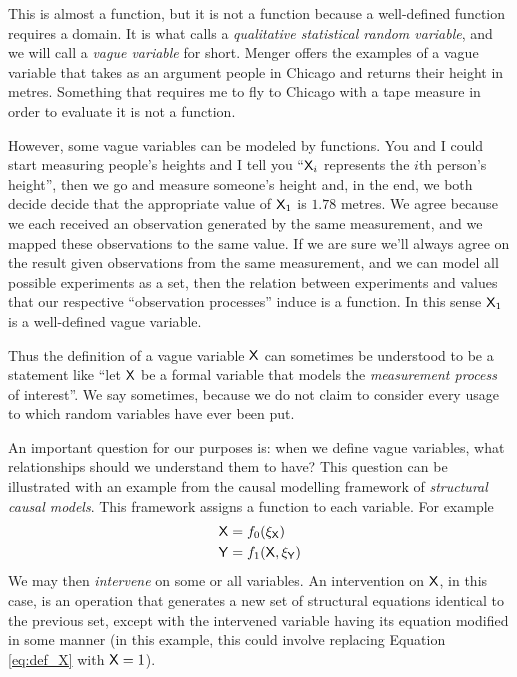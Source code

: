 This is almost a function, but it is not a function because a well-defined function requires a domain. It is what \citet{menger_random_2003} calls a \emph{qualitative statistical random variable}, and we will call a \emph{vague variable} for short. Menger offers the examples of a vague variable that takes as an argument people in Chicago and returns their height in metres. Something that requires me to fly to Chicago with a tape measure in order to evaluate it is not a function.

However, some vague variables can be modeled by functions. You and I could start measuring people's heights and I tell you ``$\mathsf{X}_i$ represents the $i$th person's height'', then we go and measure someone's height and, in the end, we both decide decide that the appropriate value of $\mathsf{X}_1$ is $1.78$ metres. We agree because we each received an observation generated by the same measurement, and we mapped these observations to the same value. If we are sure we'll always agree on the result given observations from the same measurement, and we can model all possible experiments as a set, then the relation between experiments and values that our respective ``observation processes'' induce is a function. In this sense $\mathsf{X}_1$ is a well-defined vague variable.

Thus the definition of a vague variable $\mathsf{X}$ can sometimes be understood to be a statement like ``let $\mathsf{X}$ be a formal variable that models the \emph{measurement process} of interest''. We say sometimes, because we do not claim to consider every usage to which random variables have ever been put.

An important question for our purposes is: when we define vague variables, what relationships should we understand them to have? This question can be illustrated with an example from the causal modelling framework of \emph{structural causal models}. This framework assigns a function to each variable. For example
\begin{align}
	\mathsf{X}&=f_0(\xi_{\mathsf{X}})\label{eq:def_X}\\
	\mathsf{Y}&=f_1(\mathsf{X},\xi_{\mathsf{Y}})\label{eq:def_Y}
\end{align}
We may then \emph{intervene} on some or all variables. An intervention on $\mathsf{X}$, in this case, is an operation that generates a new set of structural equations identical to the previous set, except with the intervened variable having its equation modified in some manner (in this example, this could involve replacing Equation \ref{eq:def_X} with $\mathsf{X}=1$).

